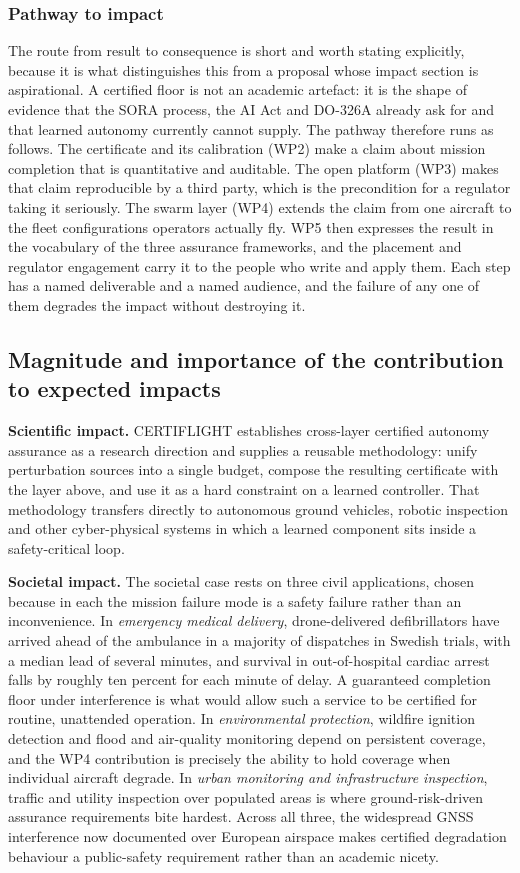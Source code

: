 \documentclass[11pt,a4paper]{article}
\begin{document}
\subsubsection*{Pathway to impact}
The route from result to consequence is short and worth stating explicitly,
because it is what distinguishes this from a proposal whose impact section is
aspirational. A certified floor is not an academic artefact: it is the shape of
evidence that the SORA process, the AI Act and DO-326A already ask for and that
learned autonomy currently cannot supply. The pathway therefore runs as follows.
The certificate and its calibration (WP2) make a claim about mission completion
that is quantitative and auditable. The open platform (WP3) makes that claim
reproducible by a third party, which is the precondition for a regulator taking
it seriously. The swarm layer (WP4) extends the claim from one aircraft to the
fleet configurations operators actually fly. WP5 then expresses the result in
the vocabulary of the three assurance frameworks, and the placement and
regulator engagement carry it to the people who write and apply them. Each step
has a named deliverable and a named audience, and the failure of any one of them
degrades the impact without destroying it.

\subsection{Magnitude and importance of the contribution to expected impacts}

\textbf{Scientific impact.} CERTIFLIGHT establishes cross-layer certified autonomy assurance as a research direction and supplies a reusable methodology: unify perturbation sources into a single budget, compose the resulting certificate with the layer above, and use it as a hard constraint on a learned controller. That methodology transfers directly to autonomous ground vehicles, robotic inspection and other cyber-physical systems in which a learned component sits inside a safety-critical loop.

\textbf{Societal impact.} The societal case rests on three civil applications, chosen because in each the mission failure mode is a safety failure rather than an inconvenience. In \emph{emergency medical delivery}, drone-delivered defibrillators have arrived ahead of the ambulance in a majority of dispatches in Swedish trials, with a median lead of several minutes, and survival in out-of-hospital cardiac arrest falls by roughly ten percent for each minute of delay. A guaranteed completion floor under interference is what would allow such a service to be certified for routine, unattended operation. In \emph{environmental protection}, wildfire ignition detection and flood and air-quality monitoring depend on persistent coverage, and the WP4 contribution is precisely the ability to hold coverage when individual aircraft degrade. In \emph{urban monitoring and infrastructure inspection}, traffic and utility inspection over populated areas is where ground-risk-driven assurance requirements bite hardest. Across all three, the widespread GNSS interference now documented over European airspace makes certified degradation behaviour a public-safety requirement rather than an academic nicety.
\end{document}
